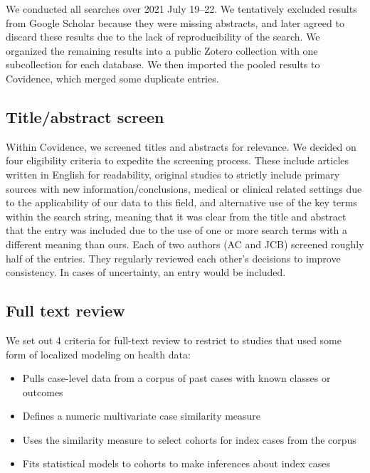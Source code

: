 \documentclass[preprint, 3p,
authoryear]{elsarticle} %
\providecommand{\tightlist}{%
  \setlength{\itemsep}{0pt}\setlength{\parskip}{0pt}}
\begin{document}
We conducted all searches over 2021 July 19--22. We tentatively excluded
results from Google Scholar because they were missing abstracts, and
later agreed to discard these results due to the lack of reproducibility
of the search. We organized the remaining results into a public Zotero
collection with one subcollection for each database. We then imported
the pooled results to Covidence, which merged some duplicate entries.

\hypertarget{titleabstract-screen}{%
\subsection{Title/abstract screen}\label{titleabstract-screen}}

Within Covidence, we screened titles and abstracts for relevance. We
decided on four eligibility criteria to expedite the screening process.
These include articles written in English for readability, original
studies to strictly include primary sources with new
information/conclusions, medical or clinical related settings due to the
applicability of our data to this field, and alternative use of the key
terms within the search string, meaning that it was clear from the title
and abstract that the entry was included due to the use of one or more
search terms with a different meaning than ours. Each of two authors (AC
and JCB) screened roughly half of the entries. They regularly reviewed
each other's decisions to improve consistency. In cases of uncertainty,
an entry would be included.

\hypertarget{full-text-review}{%
\subsection{Full text review}\label{full-text-review}}

We set out 4 criteria for full-text review to restrict to studies that
used some form of localized modeling on health data:

\begin{itemize}
\tightlist
\item
  Pulls case-level data from a corpus of past cases with known classes
  or outcomes
\item
  Defines a numeric multivariate case similarity measure
\item
  Uses the similarity measure to select cohorts for index cases from the
  corpus
\item
  Fits statistical models to cohorts to make inferences about index
  cases
\end{itemize}
\end{document}
